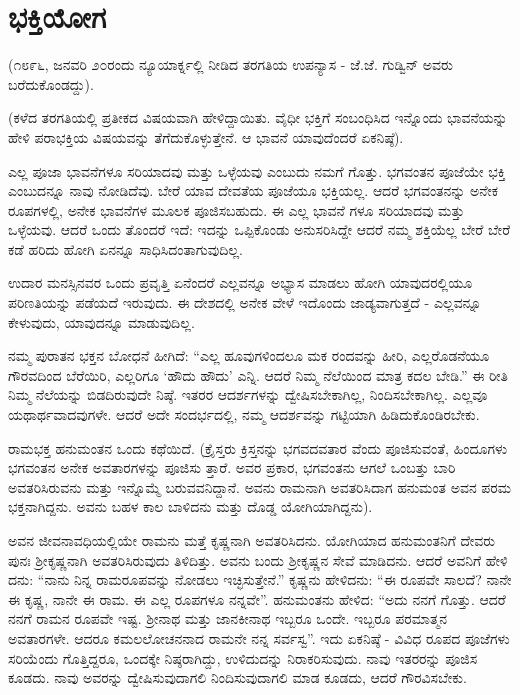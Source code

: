 
\chapter{ಭಕ್ತಿಯೋಗ}

(೧೮೯೬, ಜನವರಿ ೨೦ರಂದು ನ್ಯೂಯಾರ್ಕ್ನಲ್ಲಿ ನೀಡಿದ ತರಗತಿಯ ಉಪನ್ಯಾಸ - ಜೆ.ಜೆ. ಗುಡ್ವಿನ್ ಅವರು ಬರೆದುಕೊಂಡದ್ದು).

(ಕಳೆದ ತರಗತಿಯಲ್ಲಿ ಪ್ರತೀಕದ ವಿಷಯವಾಗಿ ಹೇಳಿದ್ದಾಯಿತು. ವೈಧೀ ಭಕ್ತಿಗೆ ಸಂಬಂಧಿಸಿದ ಇನ್ನೊಂದು ಭಾವನೆಯನ್ನು ಹೇಳಿ ಪರಾಭಕ್ತಿಯ ವಿಷಯವನ್ನು ತೆಗೆದುಕೊಳ್ಳುತ್ತೇನೆ. ಆ ಭಾವನೆ ಯಾವುದೆಂದರೆ ಏಕನಿಷ್ಠೆ).

ಎಲ್ಲ ಪೂಜಾ ಭಾವನೆಗಳೂ ಸರಿಯಾದವು ಮತ್ತು ಒಳ್ಳೆಯವು ಎಂಬುದು ನಮಗೆ ಗೊತ್ತು. ಭಗವಂತನ ಪೂಜೆಯೇ ಭಕ್ತಿ ಎಂಬುದನ್ನೂ ನಾವು ನೋಡಿದೆವು. ಬೇರೆ ಯಾವ ದೇವತೆಯ ಪೂಜೆಯೂ ಭಕ್ತಿಯಲ್ಲ. ಆದರೆ ಭಗವಂತನನ್ನು ಅನೇಕ ರೂಪಗಳಲ್ಲಿ, ಅನೇಕ ಭಾವನೆಗಳ ಮೂಲಕ ಪೂಜಿಸಬಹುದು. ಈ ಎಲ್ಲ ಭಾವನೆ ಗಳೂ ಸರಿಯಾದವು ಮತ್ತು ಒಳ್ಳೆಯವು. ಆದರೆ ಒಂದು ತೊಂದರೆ ಇದೆ: ಇದನ್ನು ಒಪ್ಪಿಕೊಂಡು ಅನುಸರಿಸಿದ್ದೇ ಆದರೆ ನಮ್ಮ ಶಕ್ತಿಯೆಲ್ಲ ಬೇರೆ ಬೇರೆ ಕಡೆ ಹರಿದು ಹೋಗಿ ಏನನ್ನೂ ಸಾಧಿಸಿದಂತಾಗುವುದಿಲ್ಲ.

ಉದಾರ ಮನಸ್ಸಿನವರ ಒಂದು ಪ್ರವೃತ್ತಿ ಏನೆಂದರೆ ಎಲ್ಲವನ್ನೂ ಅಭ್ಯಾಸ ಮಾಡಲು ಹೋಗಿ ಯಾವುದರಲ್ಲಿಯೂ ಪರಿಣತಿಯನ್ನು ಪಡೆಯದೆ ಇರುವುದು. ಈ ದೇಶದಲ್ಲಿ ಅನೇಕ ವೇಳೆ ಇದೊಂದು ಜಾಡ್ಯವಾಗುತ್ತದೆ - ಎಲ್ಲವನ್ನೂ ಕೇಳುವುದು, ಯಾವುದನ್ನೂ ಮಾಡುವುದಿಲ್ಲ.

ನಮ್ಮ ಪುರಾತನ ಭಕ್ತನ ಬೋಧನೆ ಹೀಗಿದೆ: “ಎಲ್ಲ ಹೂವುಗಳಿಂದಲೂ ಮಕ ರಂದವನ್ನು ಹೀರಿ, ಎಲ್ಲರೊಡನೆಯೂ ಗೌರವದಿಂದ ಬೆರೆಯಿರಿ, ಎಲ್ಲರಿಗೂ ‘ಹೌದು ಹೌದು’ ಎನ್ನಿ. ಆದರೆ ನಿಮ್ಮ ನೆಲೆಯಿಂದ ಮಾತ್ರ ಕದಲ ಬೇಡಿ.” ಈ ರೀತಿ ನಿಮ್ಮ ನೆಲೆಯನ್ನು ಬಿಡದಿರುವುದೇ ನಿಷ್ಠೆ. ಇತರರ ಆದರ್ಶಗಳನ್ನು ದ್ವೇಷಿಸಬೇಕಾಗಿಲ್ಲ, ನಿಂದಿಸಬೇಕಾಗಿಲ್ಲ. ಎಲ್ಲವೂ ಯಥಾರ್ಥವಾದವುಗಳೇ. ಆದರೆ ಅದೇ ಸಂದರ್ಭದಲ್ಲಿ, ನಮ್ಮ ಆದರ್ಶವನ್ನು ಗಟ್ಟಿಯಾಗಿ ಹಿಡಿದುಕೊಂಡಿರಬೇಕು.

ರಾಮಭಕ್ತ ಹನುಮಂತನ ಒಂದು ಕಥೆಯಿದೆ. (ಕ್ರೈಸ್ತರು ಕ್ರಿಸ್ತನನ್ನು ಭಗವದವತಾರ ವೆಂದು ಪೂಜಿಸುವಂತೆ, ಹಿಂದೂಗಳು ಭಗವಂತನ ಅನೇಕ ಅವತಾರಗಳನ್ನು ಪೂಜಿಸು ತ್ತಾರೆ. ಅವರ ಪ್ರಕಾರ, ಭಗವಂತನು ಆಗಲೆ ಒಂಬತ್ತು ಬಾರಿ ಅವತರಿಸಿರುವನು ಮತ್ತು ಇನ್ನೊಮ್ಮೆ ಬರುವವನಿದ್ದಾನೆ. ಅವನು ರಾಮನಾಗಿ ಅವತರಿಸಿದಾಗ ಹನುಮಂತ ಅವನ ಪರಮ ಭಕ್ತನಾಗಿದ್ದನು. ಅವನು ಬಹಳ ಕಾಲ ಬಾಳಿದನು ಮತ್ತು ದೊಡ್ಡ ಯೋಗಿಯಾಗಿದ್ದನು).

ಅವನ ಜೀವನಾವಧಿಯಲ್ಲಿಯೇ ರಾಮನು ಮತ್ತೆ ಕೃಷ್ಣನಾಗಿ ಅವತರಿಸಿದನು. ಯೋಗಿಯಾದ ಹನುಮಂತನಿಗೆ ದೇವರು ಪುನಃ ಶ‍್ರೀಕೃಷ್ಣನಾಗಿ ಅವತರಿಸಿರುವುದು ತಿಳಿದಿತ್ತು. ಅವನು ಬಂದು ಶ‍್ರೀಕೃಷ್ಣನ ಸೇವೆ ಮಾಡಿದನು. ಆದರೆ ಅವನಿಗೆ ಹೇಳಿ ದನು: “ನಾನು ನಿನ್ನ ರಾಮರೂಪವನ್ನು ನೋಡಲು ಇಚ್ಛಿಸುತ್ತೇನೆ.” ಕೃಷ್ಣನು ಹೇಳಿದನು: “ಈ ರೂಪವೇ ಸಾಲದೆ? ನಾನೇ ಈ ಕೃಷ್ಣ, ನಾನೇ ಈ ರಾಮ. ಈ ಎಲ್ಲ ರೂಪಗಳೂ ನನ್ನವೇ”. ಹನುಮಂತನು ಹೇಳಿದ: “ಅದು ನನಗೆ ಗೊತ್ತು. ಆದರೆ ನನಗೆ ರಾಮನ ರೂಪವೇ ಇಷ್ಟ. ಶ‍್ರೀನಾಥ ಮತ್ತು ಜಾನಕೀನಾಥ ಇಬ್ಬರೂ ಒಂದೇ. ಇಬ್ಬರೂ ಪರಮಾತ್ಮನ ಅವತಾರಗಳೇ. ಆದರೂ ಕಮಲಲೋಚನನಾದ ರಾಮನೇ ನನ್ನ ಸರ್ವಸ್ವ”. ಇದು ಏಕನಿಷ್ಠೆ - ವಿವಿಧ ರೂಪದ ಪೂಜೆಗಳು ಸರಿಯೆಂದು ಗೊತ್ತಿದ್ದರೂ, ಒಂದಕ್ಕೇ ನಿಷ್ಠರಾಗಿದ್ದು, ಉಳಿದುದನ್ನು ನಿರಾಕರಿಸುವುದು. ನಾವು ಇತರರನ್ನು ಪೂಜಿಸ ಕೂಡದು. ನಾವು ಅವರನ್ನು ದ್ವೇಷಿಸುವುದಾಗಲಿ ನಿಂದಿಸುವುದಾಗಲಿ ಮಾಡ ಕೂಡದು, ಆದರೆ ಗೌರವಿಸಬೇಕು.

